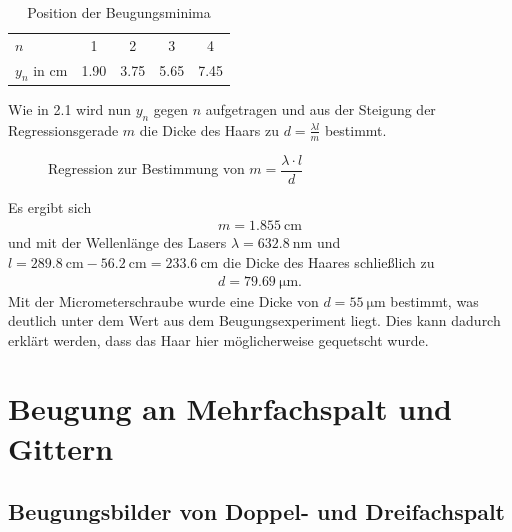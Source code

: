 \documentclass[ngerman, parskip*]{scrartcl}
\begin{document}
\begin{table}[!h]
\centering
\caption{Position der Beugungsminima}
\begin{tabular}{l|cccc}
\toprule
$n$ & 1 & 2 & 3 & 4 \\ 
$y_n$ in $\si{\cm}$ & 1.90 & 3.75 & 5.65 & 7.45 \\ 
\bottomrule
\end{tabular}
\label{table:2_4}
\end{table}

Wie in 2.1 wird nun $y_n$ gegen $n$ aufgetragen und aus der Steigung der Regressionsgerade $m$ die Dicke des Haars zu $d = \frac{\lambda l}{m}$ bestimmt.

\begin{figure}
  \centering
  \caption{Regression zur Bestimmung von $m = \dfrac{\lambda \cdot l}{d}$ }
  
\end{figure}

Es ergibt sich 
\begin{align*}
  m = \SI {1,855}{\cm}
\end{align*}
und mit der Wellenlänge des Lasers $\lambda = \SI{632,8}{\nano\meter}$ und $l = \SI{289,8}{\cm} - \SI{56,2}{\cm} = \SI{233,6}{\cm}$ die Dicke des Haares schließlich zu
\begin{align*}
  d = \SI{79,69}{\micro\meter}.
\end{align*}
Mit der Micrometerschraube wurde eine Dicke von $d = \SI{55}{\micro\meter}$ bestimmt, was deutlich unter dem Wert aus dem Beugungsexperiment liegt. Dies kann dadurch erklärt werden, dass das Haar hier möglicherweise gequetscht wurde. 




\section{Beugung an Mehrfachspalt und Gittern}

\subsection{Beugungsbilder von Doppel- und Dreifachspalt}
\end{document}
